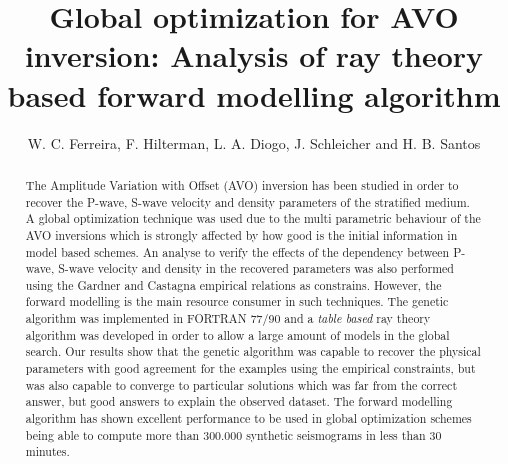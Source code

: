 \documentclass{vie16}
\begin{document}
\title{Global optimization for AVO inversion: Analysis of ray theory based forward modelling algorithm}
\author{W. C. Ferreira, F. Hilterman, L. A. Diogo, J. Schleicher and H. B. Santos}
\maketitle


\begin{abstract}
The Amplitude Variation with Offset (AVO) inversion has been studied in order to recover the P-wave, S-wave velocity and density parameters of the stratified medium. A global optimization technique was used due to the multi parametric behaviour of the AVO inversions which is strongly affected by how good is the initial information in model based schemes. An analyse to verify the effects of the dependency between P-wave, S-wave velocity and density in the recovered parameters was also performed using the Gardner and Castagna empirical relations as constrains. However, the forward modelling is the main resource consumer in such techniques. The genetic algorithm was implemented in FORTRAN 77/90  and a \textit{table based} ray theory algorithm was developed in order to allow a large amount of models in the global search. Our results show that the genetic algorithm was capable to recover the physical parameters with good agreement for the examples using the empirical constraints, but was also capable to converge to particular solutions which was far from the correct answer, but good answers to explain the observed dataset. The forward modelling algorithm has shown excellent performance to be used in global optimization schemes being able to compute more than 300.000 synthetic seismograms in less than 30 minutes.   
\end{abstract}

\newpage
\end{document}
